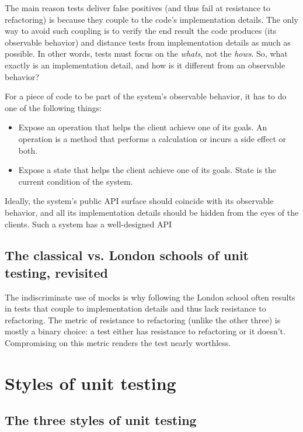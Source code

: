 \documentclass{article}
\begin{document}
The main reason tests deliver false positives (and thus fail at resistance to refactoring) is because they couple to the code’s implementation details. The only way to avoid such coupling is to verify the end result the code produces (its observable behavior) and distance tests from implementation details as much as possible. In other words, tests must focus on the \textit{whats}, not the \textit{hows}. So, what exactly is an implementation detail, and how is it different from an observable behavior?

For a piece of code to be part of the system’s observable behavior, it has to do one of the following things:

\begin{itemize}
	\item Expose an operation that helps the client achieve one of its goals. An operation is
a method that performs a calculation or incurs a side effect or both.
	\item Expose a state that helps the client achieve one of its goals. State is the current
condition of the system.
\end{itemize}

Ideally, the system’s public API surface should coincide with its observable behavior, and all its implementation details should be hidden from the eyes of the clients. Such a system has a well-designed API

\subsection{The classical vs. London schools of unit testing, revisited}

The indiscriminate use of mocks is why following the London school often results
in tests that couple to implementation details and thus lack resistance to refactoring.
The metric of resistance to refactoring (unlike the other three) is mostly a binary choice: a test either has resistance to refactoring or it doesn’t. Compromising on this metric renders the test nearly worthless.

\section{Styles of unit testing}

\subsection{The three styles of unit testing}
\end{document}
